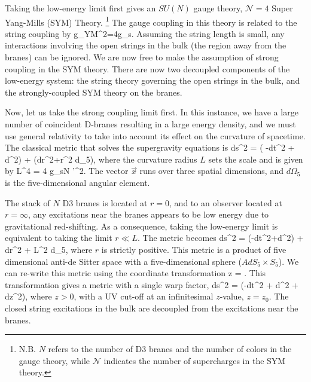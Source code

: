Taking the low-energy limit first gives an $SU(N)$ gauge theory, $\mathcal{N} =4 $ Super Yang-Mills (SYM) Theory. 
\footnote{N.B.  $N$ refers to the number of D3 branes and the number of colors in the gauge theory, while $\mathcal{N}$ indicates the number of supercharges in the SYM theory.}
The gauge coupling in this theory is related to the string coupling by
\be
g_{YM}^2=4\pi g_s.
\label{eq:gYM}
\ee
Assuming the string length is small, any interactions involving the open strings in the bulk (the region away from the branes) can be ignored.
We are now free to make the assumption of strong coupling in the SYM theory.
There are now two decoupled components of the low-energy system: the string theory governing the open strings in the bulk, and the strongly-coupled SYM theory on the branes.

Now, let us take the strong coupling limit first. 
In this instance, we have a large number of coincident D-branes resulting in a large energy density, and we must use general relativity to take into account its effect on the curvature of spacetime.
The classical metric that solves the supergravity equations is
\be
 \label{equSGmetric}
ds^{2} = \left( -dt^{2} + d^{2}\right) + (dr^{2}+r^2 d\Omega_5),
\ee
where the curvature radius $L$ sets the scale and is given by\cite{FILL-IN}
\be
L^{4} = 4 \pi g_{s}N \alpha'^{2}.
\label{eq:L4}
\ee
The vector $\vec{x}$ runs over three spatial dimensions, and $d\Omega_5$ is the five-dimensional angular element.

The stack of $N$ D3 branes is located at $r=0$, and to an observer located at $r=\infty$, any excitations near the branes appears to be low energy due to gravitational red-shifting.
As a consequence, taking the low-energy limit is equivalent to taking the limit $r \ll L$.
The metric becomes
\be
\label{equ10drmetric}
ds^{2} =  (-dt^{2}+d^{2}) + dr^{2} + L^2 d\Omega_{5},
\ee
where $r$ is strictly positive.
This metric is a product of five dimensional anti-de Sitter space with a five-dimensional sphere ($AdS_5\times S_5$).
We can re-write this metric using the coordinate transformation
\be
z = .
\ee
This transformation gives a metric with a single warp factor,
\be
\label{equ5dzmetric}
ds^{2} = \left(-dt^{2} + d^{2} + dz^{2}\right),
\ee
where  $z>0$, with a UV cut-off at an infinitesimal $z$-value, $z=z_0$.  
The closed string excitations in the bulk are decoupled from the excitations near the branes.

